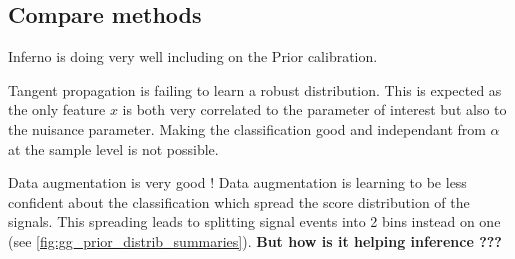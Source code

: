 \subsection{Compare methods} %
\label{sub:compare_methods}



Inferno is doing very well including on the Prior calibration.

Tangent propagation is failing to learn a robust distribution.
This is expected as the only feature $x$ is both very correlated to the parameter of interest but also to the nuisance parameter.
Making the classification good and independant from $\alpha$ at the sample level is not possible.

Data augmentation is very good !
Data augmentation is learning to be less confident about the classification which spread the score distribution of the signals.
This spreading leads to splitting signal events into 2 bins instead on one (see \autoref{fig:gg_prior_distrib_summaries}).
\textbf{But how is it helping inference ???}

